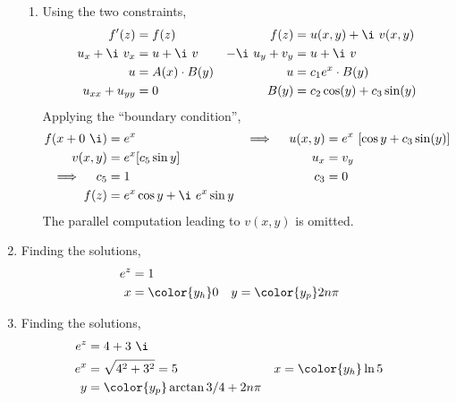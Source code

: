 \begin{enumerate}
\begin{enumerate}
              \item Using the two constraints,
                    \begin{align}
                        f'(z)           & = f(z)                     &
                        f(z)            & = u(x, y) + \i\ v(x, y)      \\
                        u_x + \i\ v_x   & = u + \i\ v                &
                        -\i\ u_y + v_y  & = u + \i\ v                  \\
                        u               & = A(x) \cdot B(y)          &
                        u               & = c_1 e^x \cdot B(y)         \\
                        u_{xx} + u_{yy} & = 0                        &
                        B(y)            & = c_2 \cos(y) + c_3\sin(y)
                    \end{align}
                    Applying the ``boundary condition'',
                    \begin{align}
                        f(x + 0\ \i)           & = e^x                         &
                        \implies \quad u(x, y) & = e^x\ [\cos y + c_3 \sin(y)]   \\
                        v(x , y)               & = e^x[c_5\sin y]              &
                        u_x                    & = v_y                           \\
                        \implies \quad c_5     & = 1                           &
                        c_3                    & = 0                             \\
                        f(z)                   & = e^x \cos y + \i\ e^x \sin y
                    \end{align}
                    The parallel computation leading to $ v(x, y) $ is omitted.
          \end{enumerate}

    \item Finding the solutions,
          \begin{align}
              e^z & = 1                   \\
              x   & = \color{y_h} 0     &
              y   & = \color{y_p} 2n\pi
          \end{align}

    \item Finding the solutions,
          \begin{align}
              e^z & = 4 + 3\ \i                          \\
              e^x & = \sqrt{4^2 + 3^2} = 5             &
              x   & = \color{y_h}  \ln 5                 \\
              y   & = \color{y_p} \arctan{3/4} + 2n\pi
          \end{align}


\end{enumerate}

